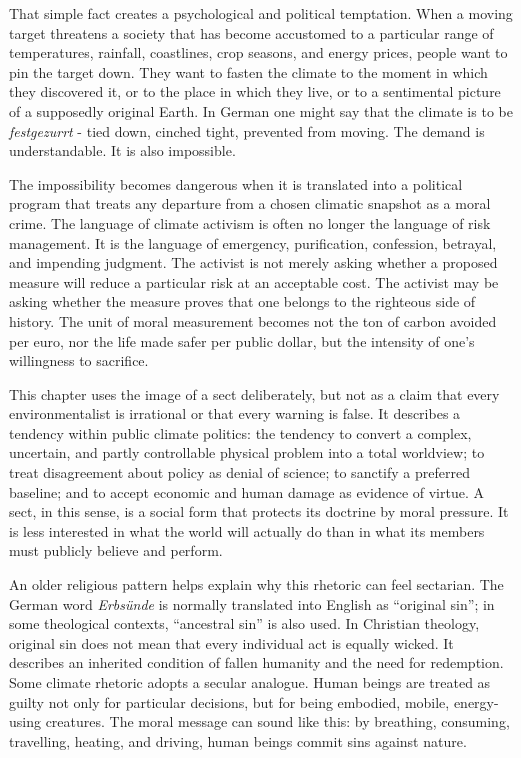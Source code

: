 ﻿\documentclass[12pt,a4paper]{book}
\begin{document}
That simple fact creates a psychological and political temptation. When a moving target threatens a society that has become accustomed to a particular range of temperatures, rainfall, coastlines, crop seasons, and energy prices, people want to pin the target down. They want to fasten the climate to the moment in which they discovered it, or to the place in which they live, or to a sentimental picture of a supposedly original Earth. In German one might say that the climate is to be \emph{festgezurrt} - tied down, cinched tight, prevented from moving. The demand is understandable. It is also impossible.

The impossibility becomes dangerous when it is translated into a political program that treats any departure from a chosen climatic snapshot as a moral crime. The language of climate activism is often no longer the language of risk management. It is the language of emergency, purification, confession, betrayal, and impending judgment. The activist is not merely asking whether a proposed measure will reduce a particular risk at an acceptable cost. The activist may be asking whether the measure proves that one belongs to the righteous side of history. The unit of moral measurement becomes not the ton of carbon avoided per euro, nor the life made safer per public dollar, but the intensity of one's willingness to sacrifice.

This chapter uses the image of a sect deliberately, but not as a claim that every environmentalist is irrational or that every warning is false. It describes a tendency within public climate politics: the tendency to convert a complex, uncertain, and partly controllable physical problem into a total worldview; to treat disagreement about policy as denial of science; to sanctify a preferred baseline; and to accept economic and human damage as evidence of virtue. A sect, in this sense, is a social form that protects its doctrine by moral pressure. It is less interested in what the world will actually do than in what its members must publicly believe and perform.

An older religious pattern helps explain why this rhetoric can feel sectarian. The German word \emph{Erbsünde} is normally translated into English as ``original sin''; in some theological contexts, ``ancestral sin'' is also used. In Christian theology, original sin does not mean that every individual act is equally wicked. It describes an inherited condition of fallen humanity and the need for redemption. Some climate rhetoric adopts a secular analogue. Human beings are treated as guilty not only for particular decisions, but for being embodied, mobile, energy-using creatures. The moral message can sound like this: by breathing, consuming, travelling, heating, and driving, human beings commit sins against nature.
\end{document}
